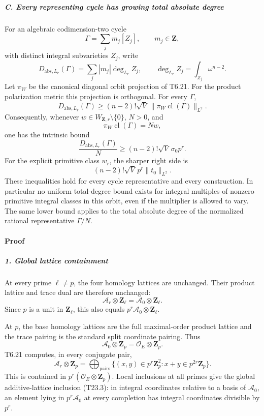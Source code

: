 \subparagraph{C. Every representing cycle has growing total absolute degree}\label{c.-every-representing-cycle-has-growing-total-absolute-degree}

For an algebraic codimension-two cycle \[
 \Gamma=\sum_j m_j[Z_j],\qquad m_j\in\mathbf Z,
\] with distinct integral subvarieties \(Z_j\), write \[
 D_{\mathrm{abs},L_r}(\Gamma)
       =\sum_j |m_j|\deg_{L_r}Z_j,
 \qquad
 \deg_{L_r}Z_j=\int_{Z_j}\omega^{n-2}.
 \tag{T23.7}
\] Let \(\pi_W\) be the canonical diagonal orbit projection of T6.21. For the product polarization metric this projection is orthogonal. For every \(\Gamma\), \[
 D_{\mathrm{abs},L_r}(\Gamma)
       \ge (n-2)!\sqrt V\,
                    \|\pi_W\operatorname{cl}(\Gamma)\|_{L^2}.
 \tag{T23.8}
\] Consequently, whenever \(w\in W_{\mathbf Z,r}\setminus\{0\}\), \(N>0\), and \[
 \pi_W\operatorname{cl}(\Gamma)=Nw,
\] one has the intrinsic bound \[
 \frac{D_{\mathrm{abs},L_r}(\Gamma)}{N}
       \ge (n-2)!\sqrt V\,\sigma_0p^r.
 \tag{T23.9}
\] For the explicit primitive class \(w_r\), the sharper right side is \[
 (n-2)!\sqrt V\,p^r\|t_0\|_{L^2}.
 \tag{T23.10}
\] These inequalities hold for every cycle representative and every construction. In particular no uniform total-degree bound exists for integral multiples of nonzero primitive integral classes in this orbit, even if the multiplier is allowed to vary. The same lower bound applies to the total absolute degree of the normalized rational representative \(\Gamma/N\).

\paragraph{Proof}\label{proof-4}

\subparagraph{1. Global lattice containment}\label{global-lattice-containment}

At every prime \(\ell\ne p\), the four homology lattices are unchanged. Their product lattice and trace dual are therefore unchanged: \[
 \mathcal A_r\otimes\mathbf Z_\ell
       =\mathcal A_0\otimes\mathbf Z_\ell.
\] Since \(p\) is a unit in \(\mathbf Z_\ell\), this also equals \(p^r\mathcal A_0\otimes\mathbf Z_\ell\).

At \(p\), the base homology lattices are the full maximal-order product lattice and the trace pairing is the standard split coordinate pairing. Thus \[
 \mathcal A_0\otimes\mathbf Z_p
       =\mathcal O_E\otimes\mathbf Z_p.
\] T6.21 computes, in every conjugate pair, \[
 \mathcal A_r\otimes\mathbf Z_p
 =\bigoplus_{\text{pairs}}
   \{(x,y)\in p^r\mathbf Z_p^2:x+y\in p^{2r}\mathbf Z_p\}.
 \tag{T23.11}
\] This is contained in \(p^r(\mathcal O_E\otimes\mathbf Z_p)\). Local inclusions at all primes give the global additive-lattice inclusion (T23.3): in integral coordinates relative to a basis of \(\mathcal A_0\), an element lying in \(p^r\mathcal A_0\) at every completion has integral coordinates divisible by \(p^r\).

